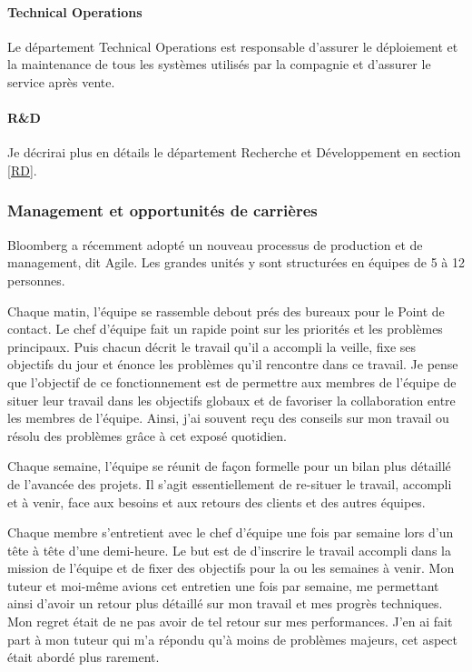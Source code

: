 \documentclass[11pt, oneside, titlepage, a4paper]{article}
\begin{document}
\paragraph{Technical Operations}
Le département Technical Operations est responsable d'assurer le déploiement et la maintenance de tous les systèmes utilisés par la compagnie et d'assurer le \og service après vente\fg{}.
\paragraph{R\&D} Je décrirai plus en détails le département Recherche et Développement en section \ref{RD}.
		\subsubsection{Management et opportunités de carrières}
Bloomberg a récemment adopté un nouveau processus de production et de management, dit \og Agile\fg{}. Les grandes unités y sont structurées en équipes de 5 à 12 personnes.

Chaque matin, l'équipe se rassemble debout prés des bureaux pour le \og Point de contact\fg{}. Le chef d'équipe fait un rapide point sur les priorités et les problèmes principaux. Puis chacun décrit le travail qu'il a accompli la veille, fixe ses objectifs du jour et énonce les problèmes qu'il rencontre dans ce travail. Je pense que l'objectif de ce fonctionnement est de permettre aux membres de l'équipe de situer leur travail dans les objectifs globaux et de favoriser la collaboration entre les membres de l'équipe. Ainsi, j'ai souvent reçu des conseils sur mon travail ou résolu des problèmes grâce à cet exposé quotidien.

Chaque semaine, l'équipe se réunit de façon formelle pour un bilan plus détaillé de l'avancée des projets. Il s'agit essentiellement de re-situer le travail, accompli et à venir, face aux besoins et aux retours des clients et des autres équipes.

Chaque membre s'entretient avec le chef d'équipe une fois par semaine lors d'un \og tête à tête\fg{} d'une demi-heure. Le but est de d'inscrire le travail accompli dans la mission de l'équipe et de fixer des objectifs pour la ou les semaines à venir. Mon tuteur et moi-même avions cet entretien une fois par semaine, me permettant ainsi d'avoir un retour plus détaillé sur mon travail et mes progrès techniques. Mon regret était de ne pas avoir de tel retour sur mes performances. J'en ai fait part à mon tuteur qui m'a répondu qu'à moins de problèmes majeurs, cet aspect était abordé plus rarement.
\end{document}
